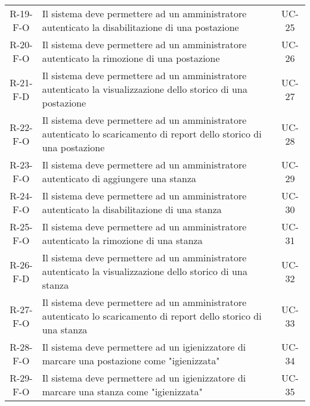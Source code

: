 \begin{longtable}{ c C{9cm} c }
    R-19-F-O & Il sistema deve permettere ad un amministratore autenticato la disabilitazione di una postazione & UC-25 \\
    R-20-F-O & Il sistema deve permettere ad un amministratore autenticato la rimozione di una postazione & UC-26 \\
    R-21-F-D & Il sistema deve permettere ad un amministratore autenticato la visualizzazione dello storico di una postazione & UC-27 \\
    R-22-F-O & Il sistema deve permettere ad un amministratore autenticato lo scaricamento di report dello storico di una postazione & UC-28 \\
    R-23-F-O & Il sistema deve permettere ad un amministratore autenticato di aggiungere una stanza & UC-29 \\
    R-24-F-O & Il sistema deve permettere ad un amministratore autenticato la disabilitazione di una stanza & UC-30 \\
    R-25-F-O & Il sistema deve permettere ad un amministratore autenticato la rimozione di una stanza & UC-31 \\
    R-26-F-D & Il sistema deve permettere ad un amministratore autenticato la visualizzazione dello storico di una stanza & UC-32 \\
    R-27-F-O & Il sistema deve permettere ad un amministratore autenticato lo scaricamento di report dello storico di una stanza & UC-33 \\
    R-28-F-O & Il sistema deve permettere ad un igienizzatore di marcare una postazione come "igienizzata" & UC-34 \\
    R-29-F-O & Il sistema deve permettere ad un igienizzatore di marcare una stanza come "igienizzata" & UC-35 \\
\end{longtable}